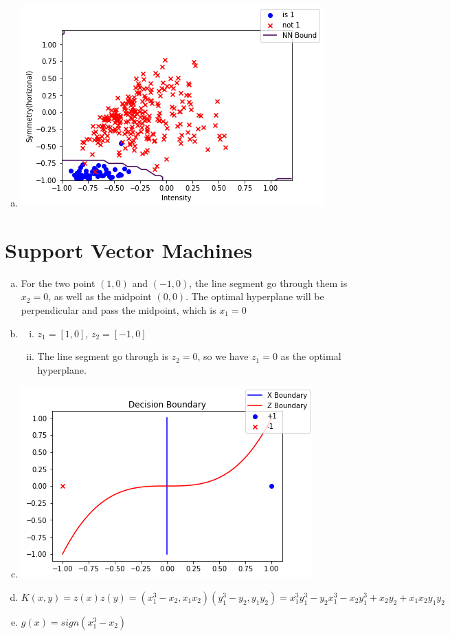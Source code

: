 \documentclass{article}
\def\math#1{$#1$}
\begin{document}
\begin{enumerate}[a)]
    \item \includegraphics[]{2/52}
\end{enumerate}

\section{Support Vector Machines}

\begin{enumerate}[a)]
    \item For the two point \math{(1, 0)} and \math{(-1, 0)}, the line segment go through them is \math{x_2 = 0}, as well as the midpoint \math{(0, 0)}. The optimal hyperplane will be perpendicular and pass the midpoint, which is \math{x_1 = 0}
    \item \begin{enumerate}[i)]
        \item \math{z_1 = [1, 0]}, \math{z_2 = [-1, 0]}
        \item The line segment go through is \math{z_2 = 0}, so we have \math{z_1 = 0} as the optimal hyperplane.
    \end{enumerate}
    \item \includegraphics[]{3/1}
    \item \math{K(x, y) = z(x)z(y) = (x_1^3-x_2, x_1x_2)(y_1^3-y_2, y_1y_2) = x_1^3y_1^3 - y_2x_1^3 - x_2y_1^3 + x_2y_2 + x_1x_2y_1y_2}
    \item \math{g(x) = sign(x_1^3 - x_2)}
\end{enumerate}
\end{document}

